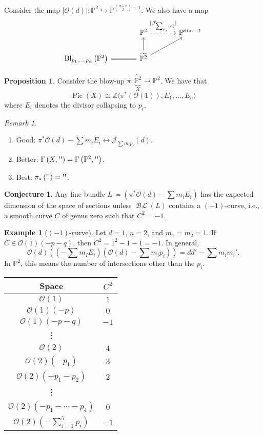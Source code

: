 \documentclass[10pt,letterpaper,cm]{nupset}
\theoremstyle{definition}
\newtheorem{exmp}[defn]{Example}
\theoremstyle{theorem}
\newtheorem{prop}[defn]{Proposition}
\newtheorem{conj}[defn]{Conjecture}
\theoremstyle{remark}
\newtheorem{remark}[defn]{Remark}
\newcommand{\J}{\mathcal J}
\renewcommand{\O}{\mathcal O}
\renewcommand{\P}{\mathbb P}
\newcommand{\Z}{\mathbb Z}
\newcommand{\1}{\mathbb{1}}
\newcommand{\0}{\vec 0}
\DeclareMathOperator{\pic}{Pic}
\DeclareMathOperator{\BL}{\mathcal{BL}}
\DeclareMathOperator{\bl}{\mathrm{Bl}}
\newcommand{\be}{\begin{enumerate}}
\newcommand{\ee}{\end{enumerate}}
\begin{document}
Consider the map $\lvert{\O(d)}\rvert : \P^2 \hookrightarrow \P^{{{d+2}\choose 2} -1}$. We also have a map
\[
\begin{tikzcd}[column sep = large]
                                                    & \P^2 \arrow[r, "\lvert{\J_{\sum_{p_i}(d)}}\rvert", dashed] & \P^{\dim -1} \\
{\bl_{p_1, \ldots, p_n}\left(\P^2\right)} \arrow[r, equals] & \widetilde{\P^2} \arrow[u] \arrow[ru]                      &             
\end{tikzcd}
\]

\begin{prop}
Consider the blow-up $\pi : \underbrace{\widetilde{\P^2}}_{X} \to \P^2$. We have that $$\pic(X) \cong \Z\langle \pi^{\ast}\left(\O(1)\right), E_1, \ldots, E_n\rangle$$ where $E_i$ denotes the divisor collapsing to $p_i$.
\end{prop}

\begin{remark} $ $
\be
\item[Good:] $\pi^{\ast}{\O(d)} - \sum{m_iE_i} \longleftrightarrow \J_{\sum{m_ip_i}}(d)$.
\item[Better:] $\Gamma\left(X, \text{\textquotesingle\textquotesingle}\right) = \Gamma\left(\P^2, \text{\textquotesingle\textquotesingle}\right) $.
\item[Best:] $\pi_{\ast}\left( \text{\textquotesingle\textquotesingle}\right) =  \text{\textquotesingle\textquotesingle}$.
\ee
\end{remark}

\begin{conj}
Any line bundle $L \coloneqq \left(\pi^{\ast}{\O(d)} -\sum{m_iE_i}\right)$ has the expected dimension of the space of sections unless $\BL\left(L\right)$ contains a $\left({-1}\right)$-curve, i.e., a smooth curve $C$ of genus zero  such that $C^2 = {-1}$.
\end{conj}

\begin{exmp}[$\left({-1}\right)$-curve]
Let $d=1$, $n=2$, and $m_1=m_2 =1$. If $C\in \O(1)({-p}-q)$, then $C^2 =1^2 -1-1 = {-1}$. In general, 
\[
\O(d)\left (\left({-\sum m_IE_i}\right)\left(\O(d) -\sum m_ip_i\right)\right) = dd' -\sum{m_im_i'}.
\] In $\P^2$, this means the number of intersections other than the $p_i$.
\begin{table}[H]
\centering
\begin{tabular}{c|c}
Space & $C^2$ \\ \hline
$\O(1)$ & $1$ \\
$\O(1)({-p})$ & $0$ \\
$\O(1)({-p}-q)$ & ${-1}$ \\
\vdots &  \\
$\O(2)$ & $4$ \\
$\O(2)\left({-p}_1\right)$ & $3$ \\
$\O(2)\left({-p_1} -p_2\right)$ & $2$ \\
\vdots &  \\
$\O(2)\left({-p_1} -\cdots - p_4\right)$ & $0$ \\
$\O(2)\left({-\sum_{i=1}^5 p_i}\right)$ & ${-1}$
\end{tabular}
\end{table}
\end{exmp}
\end{document}
